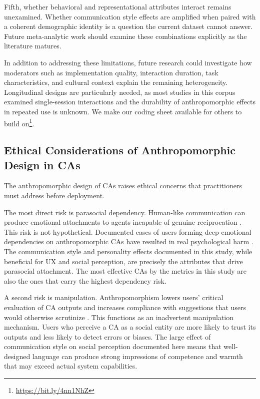 \documentclass[lettersize,journal]{IEEEtran}
\begin{document}
Fifth, whether behavioral and representational attributes interact remains unexamined. Whether communication style effects are amplified when paired with a coherent demographic identity is a question the current dataset cannot answer. Future meta-analytic work should examine these combinations explicitly as the literature matures.

In addition to addressing these limitations, future research could investigate how moderators such as implementation quality, interaction duration, task characteristics, and cultural context explain the remaining heterogeneity. Longitudinal designs are particularly needed, as most studies in this corpus examined single-session interactions and the durability of anthropomorphic effects in repeated use is unknown. We make our coding sheet available for others to build on\footnote{\href{https://osf.io/7rj6f/overview?view_only=35b327583fee4222b5b336465107580c}{https://bit.ly/4nn1NhZ}}.

\subsection{Ethical Considerations of Anthropomorphic Design in CAs}

The anthropomorphic design of CAs raises ethical concerns that practitioners must address before deployment.

The most direct risk is parasocial dependency. Human-like communication can produce emotional attachments to agents incapable of genuine reciprocation \cite{chaves2021should}. This risk is not hypothetical. Documented cases of users forming deep emotional dependencies on anthropomorphic CAs have resulted in real psychological harm \cite{laura_kuenssberg_mothers_2025}. The communication style and personality effects documented in this study, while beneficial for UX and social perception, are precisely the attributes that drive parasocial attachment. The most effective CAs by the metrics in this study are also the ones that carry the highest dependency risk.

A second risk is manipulation. Anthropomorphism lowers users' critical evaluation of CA outputs and increases compliance with suggestions that users would otherwise scrutinize \cite{chaves2021should}. This functions as an inadvertent manipulation mechanism. Users who perceive a CA as a social entity are more likely to trust its outputs and less likely to detect errors or biases. The large effect of communication style on social perception documented here means that well-designed language can produce strong impressions of competence and warmth that may exceed actual system capabilities.
\end{document}
